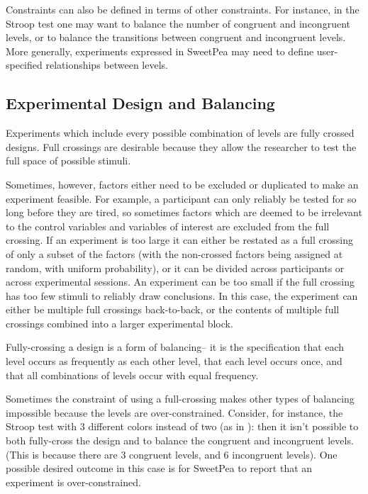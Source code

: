 Constraints can also be defined in terms of other constraints. For instance, in the Stroop test one may want to balance the number of congruent and incongruent levels, or to balance the transitions between congruent and incongruent levels. More generally, experiments expressed in SweetPea may need to define user-specified relationships between levels.

\subsection{Experimental Design and Balancing}

Experiments which include every possible combination of levels are fully crossed designs. Full crossings are desirable because they allow the researcher to test the full space of possible stimuli.

Sometimes, however, factors either need to be excluded or duplicated to make an experiment feasible. For example, a participant can only reliably be tested for so long before they are tired, so sometimes factors which are deemed to be irrelevant to the control variables and variables of interest are excluded from the full crossing. If an experiment is too large it can either be restated as a full crossing of only a subset of the factors (with the non-crossed factors being assigned at random, with uniform probability), or it can be divided across participants or across experimental sessions. An experiment can be too small if the full crossing has too few stimuli to reliably draw conclusions. In this case, the experiment can either be multiple full crossings back-to-back, or the contents of multiple full crossings combined into a larger experimental block.

Fully-crossing a design is a form of balancing-- it is the specification that each level occurs as frequently as each other level, that each level occurs once, and that all combinations of levels occur with equal frequency.



Sometimes the constraint of using a full-crossing makes other types of balancing impossible because the levels are over-constrained. Consider, for instance, the Stroop test with 3 different colors instead of two (as in ): then it isn't possible to both fully-cross the design and to balance the congruent and incongruent levels. (This is because there are 3 congruent levels, and 6 incongruent levels). One possible desired outcome in this case is for SweetPea to report that an experiment is over-constrained.

